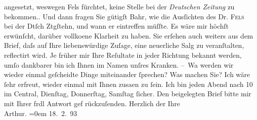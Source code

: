 \begin{ledgroupsized}[t]{13cm}
{{{                  angesetzt, weswegen Fels fürchtet, keine
                  Stelle bei der \emph{Deutschen Zeitung} zu
                  bekommen.}}}\label{K_L00178-1h}. Und dann fragen Sie gütigſt Bahr, wie die Ausſichten des Dr. \textsc{Fels} bei der Dtſch Ztgſtehn, und wann er eintreffen müſſte. Es wäre mir
               höchſt erwünſcht, darüber vollko{\geminationm}ene Klarheit zu haben.
               Sie erſehen auch {\pb}weiters aus dem Brief, daſs auf Ihre
               liebenswürdige Zuſage, eine neuerliche Sa{\geminationm}lg zu
               veranſtalten, reflectirt wird. Je früher mir Ihre Reſultate in jeder Richtung bekannt
               werden, umſo dankbarer bin ich Ihnen im Namen unſres Kranken.\pend
           \pstart
           – Wa{\geminationn} werden wir wieder einmal geſcheidte Dinge {\pb}miteinander ſprechen? Was machen Sie? Ich wäre ſehr
               erfreut, wieder einmal mit Ihnen zusa{\geminationm}en zu ſein. Ich
               bin jeden Abend nach 10 im Central, Dienſtag,
               Donnerſtag, Samſtag ſicher. Den beigelegten Brief bitte mir mit Ihrer frdl Antwort
               gef rückzuſenden.\pend
           \pstart
           {\pb}Herzlich der Ihre{\\[\baselineskip]}\spacefill\mbox{Arthur.}\pend
           \leftskip=0em{}\pstart
           \raggedleft{}18. 2. 93\pend
           
         
         \endnumbering{}\end{ledgroupsized}  \newcommand{\dateiname}{L00178}\newcommand{\titel}{Arthur Schnitzler an Hugo von Hofmannsthal, 18. 2. 1893}\newcommand{\editorInnen}{ Martin Anton Müller und Gerd-Hermann Susen}
      